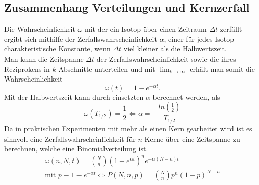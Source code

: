 \documentclass{article}
\begin{document}
	\subsection{Zusammenhang Verteilungen und Kernzerfall}
	Die Wahrscheinlichkeit $\omega$ mit der ein Isotop über einen Zeitraum $\Delta t$ zerfällt ergibt sich mithilfe der Zerfallswahrscheinlichkeit $\alpha$, einer für jedes Isotop charakteristische Konstante, wenn $\Delta t$ viel kleiner als die Halbwertszeit.\\
	Man kann die Zeitspanne $\Delta t$ der Zerfallswahrscheinlichkeit sowie die ihres Reziprokens in $k$ Abschnitte unterteilen und mit $\lim_{k \rightarrow\infty}$ erhält man somit die Wahrscheinlichkeit
	\begin{equation}
	\omega(t)=1-e^{-\alpha t}.
	\end{equation}  
	Mit der Halbwertszeit kann durch einsetzten $\alpha$ berechnet werden, als 
	\begin{equation}
	\omega(T_{1/2})=\frac{1}{2} \Leftrightarrow \alpha=-\frac{ln(\frac{1}{2})}{T_{1/2}}
	\end{equation}
	\newpage \noindent
	Da in praktischen Experimenten mit mehr als einen Kern gearbeitet wird ist es sinnvoll eine Zerfallswahrscheinlichkeit für $n$ Kerne über eine Zeitspanne zu berechnen, welche eine Binomialverteilung ist.
	\begin{gather}
	\omega(n,N,t)=\binom{N}{n}(1-e^{\alpha t})^ne^{-\alpha(N-n)t}\\
	\text{mit }p\equiv1-e^{-\alpha t} \Leftrightarrow P(N,n,p)=\binom{N}{n}p^n(1-p)^{N-n}
	\end{gather} 
\end{document}
